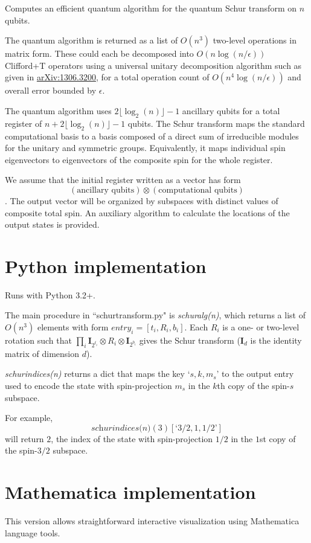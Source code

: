 \documentclass[12pt]{article}
\begin{document}
Computes an efficient quantum algorithm for the quantum Schur transform on $n$ qubits.

The quantum algorithm is returned as a list of $O(n^3)$ two-level operations in matrix form.
These could each be decomposed into $O(n\log(n/\epsilon))$ Clifford+T operators using a universal unitary decomposition algorithm such as given in \href{arXiv:1306.3200}{arXiv:1306.3200}, for a total operation count of $O(n^4\log(n/\epsilon))$ and overall error bounded by $\epsilon$.

The quantum algorithm uses $2\lfloor\log_2(n)\rfloor-1$ ancillary qubits for a total register of $n+2\lfloor\log_2(n)\rfloor-1$ qubits.
The Schur transform maps the standard computational basis to a basis composed of a direct sum of irreducible modules for the unitary and symmetric groups.
Equivalently, it maps individual spin eigenvectors to eigenvectors of the composite spin for the whole register.

We assume that the initial register written as a vector has form $$(\text{ancillary qubits})\otimes(\text{computational qubits})$$.
The output vector will be organized by subspaces with distinct values of composite total spin.
An auxiliary algorithm to calculate the locations of the output states is provided.

\section*{Python implementation}
Runs with Python 3.2+.

The main procedure in ``schurtransform.py" is \emph{schuralg(n)}, which returns a list of $O(n^3)$ elements with form $entry_i=[t_i,R_i,b_i]$.
Each $R_i$ is a one- or two-level rotation such that $\prod_i\textbf{I}_{2^{t_i}}\otimes R_i\otimes\textbf{I}_{2^{b_i}}$ gives the Schur transform ($\textbf{I}_d$ is the identity matrix of dimension $d$).

\emph{schurindices(n)} returns a dict that maps the key `$s,k,m_s$' to the output entry used to encode the state with spin-projection $m_s$ in the $k$th copy of the spin-$s$ subspace.

For example, $$\textit{schurindices(n)}(3)[\text{`}3/2,1,1/2\text{'}]$$ will return $2$, the index of the state with spin-projection $1/2$ in the $1$st copy of the spin-$3/2$ subspace.


\section*{Mathematica implementation}
This version allows straightforward interactive visualization using Mathematica language tools.
\end{document}
